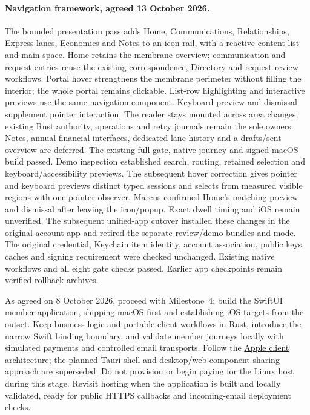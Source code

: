 \documentclass[11pt]{article}
\begin{document}
\paragraph{Navigation framework, agreed 13 October 2026.}
The bounded presentation pass adds Home, Communications, Relationships, Express
lanes, Economics and Notes to an icon rail, with a reactive content list and main
space. Home retains the membrane overview; communication and request entries reuse
the existing correspondence, Directory and request-review workflows. Portal hover
strengthens the membrane perimeter without filling the interior; the whole portal
remains clickable. List-row highlighting and interactive previews use the same
navigation component. Keyboard
preview and dismissal supplement pointer interaction. The reader stays mounted
across area changes; existing Rust authority, operations and retry journals remain
the sole owners. Notes, annual financial interfaces, dedicated lane history and a
drafts/sent overview are deferred. The existing full gate, native journey and signed
macOS build passed. Demo inspection established search, routing, retained selection
and keyboard/accessibility previews. The subsequent hover correction gives pointer
and keyboard previews distinct typed sessions and selects from measured visible
regions with one pointer observer. Marcus confirmed Home's matching preview and
dismissal after leaving the icon/popup. Exact dwell timing and iOS remain unverified.
The subsequent unified-app cutover installed these changes in the original account
app and retired the separate review/demo bundles and mode. The original credential,
Keychain item identity, account association, public keys, caches and signing requirement
were checked unchanged. Existing native workflows and all eight gate checks passed.
Earlier app checkpoints remain verified rollback archives.

As agreed on 8 October 2026, proceed with Milestone~4: build the SwiftUI member
application, shipping macOS first and establishing iOS targets from the outset.
Keep business logic and portable client workflows in Rust, introduce the narrow
Swift binding boundary, and validate member journeys locally with simulated
payments and controlled email transports. Follow the
\href{docs/apple-client-architecture.md}{Apple client architecture}; the planned
Tauri shell and desktop/web component-sharing approach are superseded.
Do not provision or begin paying for the Linux host during this stage. Revisit
hosting when the application is built and locally validated, ready for public
HTTPS callbacks and incoming-email deployment checks.
\end{document}
